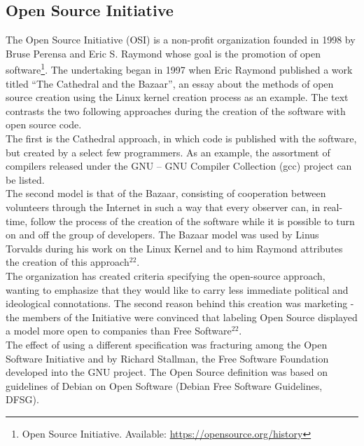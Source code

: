 \documentclass[a4paper]{article}
\begin{document}
\subsection{Open Source Initiative} 

The Open Source Initiative (OSI) is a non-profit organization founded in 1998 by Bruse Perensa and Eric S. Raymond whose goal is the promotion of open software\footnote{Open Source Initiative. Available: \url{https://opensource.org/history}}. The undertaking began in 1997 when Eric Raymond published a work titled ``The Cathedral and the Bazaar'', an essay about the methods of open source creation using the Linux kernel creation process as an example. The text contrasts the two following approaches during the creation of the software with open source code. \\

\noindent
The first is the Cathedral approach, in which code is published with the software, but created by a select few programmers. As an example, the assortment of compilers released under the GNU -- GNU Compiler Collection (gcc) project can be listed. \\

\noindent
The second model is that of the Bazaar, consisting of cooperation between volunteers through the Internet in such a way that every observer can, in real-time, follow the process of the creation of the software while it is possible to turn on and off the group of developers. The Bazaar model was used by Linus Torvalds during his work on the Linux Kernel and to him Raymond attributes the creation of this approach$^{22}$. \\ 

\noindent
The organization has created criteria specifying the open-source approach, wanting to emphasize that they would like to carry less immediate political and ideological connotations. The second reason behind this creation was marketing - the members of the Initiative were convinced that labeling Open Source displayed a model more open to companies than Free Software$^{22}$. \\

\noindent
The effect of using a different specification was fracturing among the Open Software Initiative and by Richard Stallman, the Free Software Foundation developed into the GNU project. The Open Source definition was based on guidelines of Debian on Open Software (Debian Free Software Guidelines, DFSG). 
\end{document}
